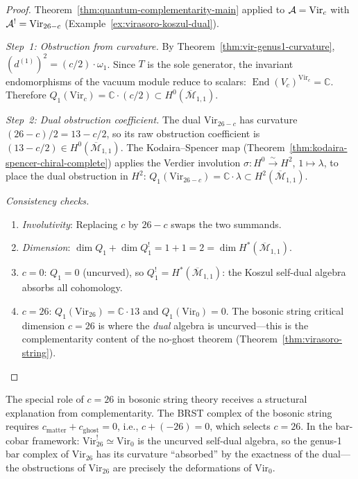 \begin{proof}
Theorem~\ref{thm:quantum-complementarity-main} applied to
$\mathcal{A} = \mathrm{Vir}_c$ with $\mathcal{A}^! = \mathrm{Vir}_{26-c}$
(Example~\ref{ex:virasoro-koszul-dual}).

\emph{Step~1: Obstruction from curvature.}
By Theorem~\ref{thm:vir-genus1-curvature},
$(d^{(1)})^2 = (c/2) \cdot \omega_1$.  Since $T$ is the sole generator,
the invariant endomorphisms of the vacuum module reduce to scalars:
$\operatorname{End}(V_c)^{\mathrm{Vir}_c} = \mathbb{C}$.
Therefore $Q_1(\mathrm{Vir}_c) = \mathbb{C} \cdot (c/2) \subset
H^0(\overline{\mathcal{M}}_{1,1})$.

\emph{Step~2: Dual obstruction coefficient.}
The dual $\mathrm{Vir}_{26-c}$ has curvature $(26-c)/2 = 13 - c/2$, so
its raw obstruction coefficient is $(13 - c/2) \in H^0(\overline{\mathcal{M}}_{1,1})$.
The Kodaira--Spencer map (Theorem~\ref{thm:kodaira-spencer-chiral-complete})
applies the Verdier involution $\sigma\colon H^0 \xrightarrow{\sim} H^2$,
$1 \mapsto \lambda$, to place the dual obstruction in $H^2$:
$Q_1(\mathrm{Vir}_{26-c}) = \mathbb{C} \cdot \lambda \subset
H^2(\overline{\mathcal{M}}_{1,1})$.

\emph{Consistency checks.}
\begin{enumerate}
\item \emph{Involutivity}: Replacing $c$ by $26-c$ swaps the two
  summands. \checkmark
\item \emph{Dimension}: $\dim Q_1 + \dim Q_1^! = 1 + 1 = 2 =
  \dim H^*(\overline{\mathcal{M}}_{1,1})$. \checkmark
\item \emph{$c = 0$}: $Q_1 = 0$ (uncurved), so $Q_1^! =
  H^*(\overline{\mathcal{M}}_{1,1})$: the Koszul self-dual algebra absorbs
  all cohomology. \checkmark
\item \emph{$c = 26$}: $Q_1(\mathrm{Vir}_{26}) = \mathbb{C} \cdot 13$
  and $Q_1(\mathrm{Vir}_0) = 0$.  The bosonic string critical dimension
  $c = 26$ is where the \emph{dual} algebra is uncurved---this is the
  complementarity content of the no-ghost theorem
  (Theorem~\ref{thm:virasoro-string}). \checkmark
\end{enumerate}
\end{proof}

\begin{remark}\label{rem:vir-bosonic-string}
The special role of $c = 26$ in bosonic string theory receives a
structural explanation from complementarity.  The BRST complex of the
bosonic string requires $c_{\mathrm{matter}} + c_{\mathrm{ghost}} = 0$,
i.e., $c + (-26) = 0$, which selects $c = 26$.  In the bar-cobar framework:
$\mathrm{Vir}_{26}^! \simeq \mathrm{Vir}_0$ is the uncurved self-dual
algebra, so the genus-1 bar complex of $\mathrm{Vir}_{26}$ has its
curvature ``absorbed'' by the exactness of the dual---the obstructions
of $\mathrm{Vir}_{26}$ are precisely the deformations of $\mathrm{Vir}_0$.
\end{remark}


